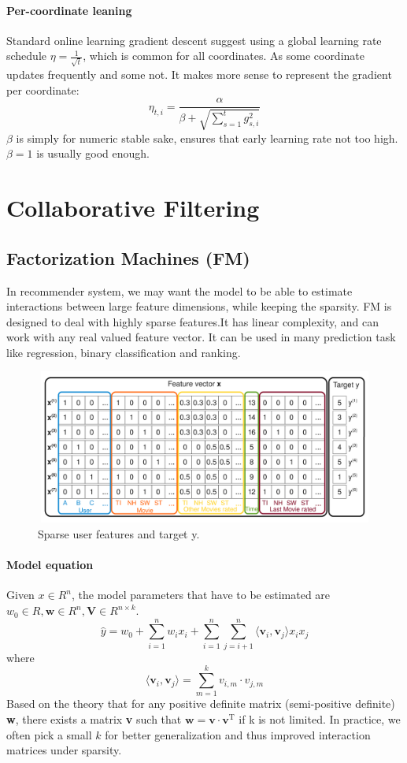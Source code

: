 \documentclass{article}
\begin{document}
\paragraph{Per-coordinate leaning} Standard online learning gradient descent suggest using a global learning rate schedule $\eta=\frac{1}{\sqrt{t}}$, which is common for all coordinates. As some coordinate updates frequently and some not. It makes more sense to represent the gradient per coordinate:
$$\eta_{t,i}=\frac{\alpha}{\beta+\sqrt{\sum_{s=1}^{t}g^{2}_{s,i}}}$$
$\beta$ is simply for numeric stable sake, ensures that early learning rate not too high. $\beta=1$ is usually good enough. 
\section{Collaborative Filtering}
\subsection{Factorization Machines (FM)}
In recommender system, we may want the model to be able to estimate interactions between large feature dimensions, while keeping the sparsity.
FM \cite{DBLP:conf/icdm/Rendle10} is designed to deal with highly sparse features.It has linear complexity, and can work with any real valued feature vector. It can be used in many prediction task like regression, binary classification and ranking. 
\begin{figure}[H]
\centering
\includegraphics[width=4.9in,height=2in]{figure2}
\caption{Sparse user features and target y.}
\end{figure}
\paragraph{Model equation} Given $x \in R^{n}$, the model parameters that have to be estimated are $ w_{0} \in R, \textbf{w} \in R^{n}, \textbf{V} \in R^{n \times k}$.
$$\widehat{y}= w_{0}+\sum_{i=1}^{n}w_{i}x_{i}+\sum_{i=1}^{n}\sum_{j=i+1}^{n}\langle \textbf{v}_{i} ,\textbf{v}_{j} \rangle x_{i}x_{j}$$
where 
$$\langle \textbf{v}_{i} ,\textbf{v}_{j} \rangle =\sum_{m=1}^{k}v_{i,m} \cdot v_{j,m}$$
Based on the theory that for any positive definite matrix (semi-positive definite) \textbf{w}, there exists a matrix \textbf{v} such that $\textbf{w}=\textbf{v} \cdot \textbf{v}^\mathrm{T}$ if k is not limited. In practice, we often pick a small $k$ for better generalization
and thus improved interaction matrices under sparsity.
\end{document}
